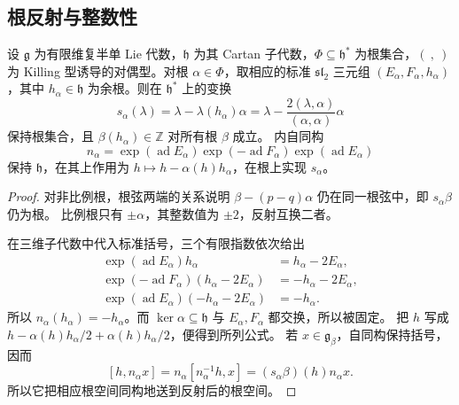 \subsection{根反射与整数性}
\label{b5:subsec:1603:03}

\begin{proposition}\label{b5:prop:root-reflection}
	设 \(\mathfrak g\) 为有限维复半单 Lie 代数，\(\mathfrak h\) 为其 Cartan 子代数，\(\Phi\subseteq\mathfrak h^*\) 为根集合，\((\ ,\ )\) 为 Killing 型诱导的对偶型。对根 \(\alpha\in\Phi\)，取相应的标准 \(\mathfrak{sl}_2\) 三元组 \((E_\alpha,F_\alpha,h_\alpha)\)，其中 \(h_\alpha\in\mathfrak h\) 为余根。则在 \(\mathfrak h^*\) 上的变换
	\[
		s_\alpha(\lambda) =\lambda-\lambda(h_\alpha)\alpha =\lambda-\frac{2(\lambda,\alpha)}{(\alpha,\alpha)}\alpha
	\]
	保持根集合，且 \(\beta(h_\alpha)\in\mathbb Z\) 对所有根 \(\beta\) 成立。 内自同构
	\[
		n_\alpha=\exp(\operatorname{ad}E_\alpha) \exp(-\operatorname{ad}F_\alpha) \exp(\operatorname{ad}E_\alpha)
	\]
	保持 \(\mathfrak h\)，在其上作用为 \(h\mapsto h-\alpha(h)h_\alpha\)，在根上实现 \(s_\alpha\)。
\end{proposition}
\begin{proof}
	对非比例根，根弦两端的关系说明 \(\beta-(p-q)\alpha\) 仍在同一根弦中，即 \(s_\alpha\beta\) 仍为根。 比例根只有 \(\pm\alpha\)，其整数值为 \(\pm2\)，反射互换二者。

	在三维子代数中代入标准括号，三个有限指数依次给出
	\[
		\begin{aligned}
			\exp(\operatorname{ad}E_\alpha)h_\alpha&=h_\alpha-2E_\alpha,\\
			\exp(-\operatorname{ad}F_\alpha)(h_\alpha-2E_\alpha)&=-h_\alpha-2E_\alpha,\\
			\exp(\operatorname{ad}E_\alpha)(-h_\alpha-2E_\alpha)&=-h_\alpha.
		\end{aligned}
	\]
	所以 \(n_\alpha(h_\alpha)=-h_\alpha\)。而 \(\ker\alpha\subseteq\mathfrak h\) 与 \(E_\alpha,F_\alpha\) 都交换，所以被固定。 把 \(h\) 写成 \(h-\alpha(h)h_\alpha/2+\alpha(h)h_\alpha/2\)，便得到所列公式。 若 \(x\in\mathfrak g_\beta\)，自同构保持括号，因而
	\[
		[h,n_\alpha x] =n_\alpha[n_\alpha^{-1}h,x] =(s_\alpha\beta)(h)n_\alpha x.
	\]
	所以它把相应根空间同构地送到反射后的根空间。
\end{proof}

